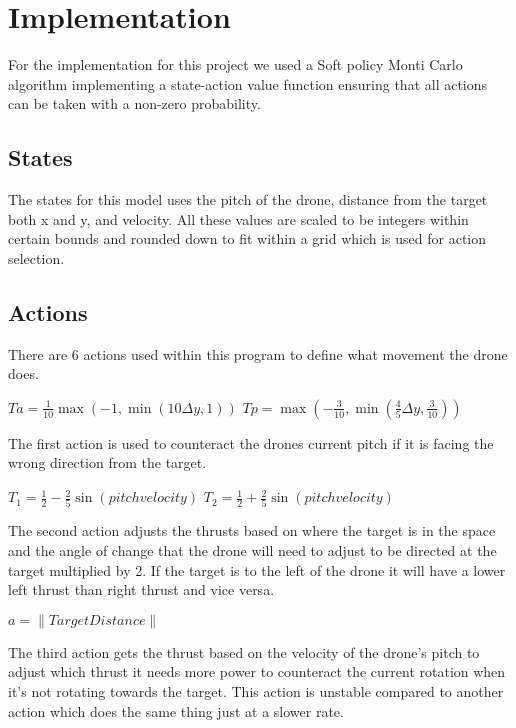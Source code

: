\section{Implementation}
For the implementation for this project we used a Soft policy Monti Carlo algorithm implementing a state-action value function ensuring that all actions can be taken with a non-zero probability. 

\subsection{States}
The states for this model uses the pitch of the drone, distance from the target both x and y, and velocity. All these values are scaled to be integers within certain bounds and rounded down to fit within a grid which is used for action selection.  

\subsection{Actions}
There are 6 actions used within this program to define what movement the drone does.

\begingroup\centering
$Ta =  \frac{1}{10}\max (-1,\min (10\Delta y,1))$
$Tp = \max (-\frac{3}{10},\min (\frac{4}{5}\Delta y,\frac{3}{10}))$

\endgroup


The first action is used to counteract the drones current pitch if it is facing the wrong direction from the target. 

\begingroup\centering
$T_1 = \frac{1}{2} - \frac{2}{5} \sin (pitchvelocity)$
$T_2 = \frac{1}{2} + \frac{2}{5} \sin (pitchvelocity)$

\endgroup

The second action adjusts the thrusts based on where the target is in the space and the angle of change that the drone will need to adjust to be directed at the target multiplied by 2. If the target is to the left of the drone it will have a lower left thrust than right thrust and vice versa. 

\begingroup\centering
$a=\left \| Target Distance \right \|$

\endgroup

The third action gets the thrust based on the velocity of the drone's pitch to adjust which thrust it needs more power to counteract the current rotation when it’s not rotating towards the target. This action is unstable compared to another action which does the same thing just at a slower rate.

